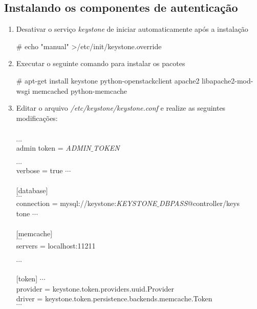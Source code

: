 	\subsection{Instalando os componentes de autenticação}
	\begin{enumerate}
		\item Desativar o serviço \emph{keystone} de iniciar automaticamente após a instalação
		
		\begin{snugshade}
			\# echo "manual" \textgreater /etc/init/keystone.override \\
		\end{snugshade} 
		
		\item Executar o seguinte comando para instalar os pacotes
		\begin{snugshade}
			\# apt-get install keystone python-openstackclient apache2 libapache2-mod-wsgi memcached python-memcache
		\end{snugshade}
		
		\item Editar o arquivo \emph{/etc/keystone/keystone.conf} e realize as seguintes modificações:
		\begin{snugshade}
			[DEFAULT] \\
			$\cdots$ \\
			admin token = \emph{ADMIN$\_$TOKEN} \\ \\
			$\cdots$ \\
			verbose = true
			$\cdots$ \\ \\
			
			[database] \\
			$\cdots$ \\
			connection = mysql://keystone:\emph{KEYSTONE$\_$DBPASS}@controller/keys\\tone
			$\cdots$ \\ \\
			
			[memcache] \\
			$\cdots$ \\
			servers = localhost:11211 \\ \\
			$\cdots$ \\ \\
			
			[token]
			$\cdots$ \\ 
			provider = keystone.token.providers.uuid.Provider \\
			driver = keystone.token.persistence.backends.memcache.Token \\
			$\cdots$ \\ \\
			

\end{snugshade}
\end{enumerate}
